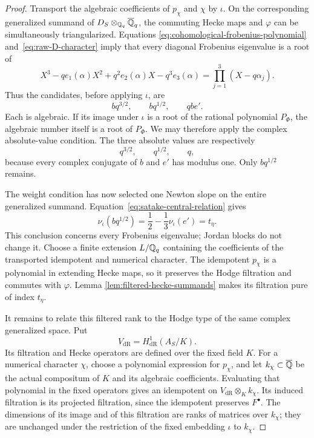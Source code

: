 \begin{proof}
Transport the algebraic coefficients of \(p_\chi\) and \(\chi\) by
\(\iota\). On the corresponding generalized summand of
\(D_S\otimes_{\mathbb{Q}_q}\overline{\mathbb{Q}}_q\), the commuting Hecke maps and
\(\varphi\) can be simultaneously triangularized. Equations
\eqref{eq:cohomological-frobenius-polynomial}
and~\eqref{eq:raw-D-character} imply that every diagonal Frobenius
eigenvalue is a root of
\[
X^3-qe_1(\alpha)X^2+q^2e_2(\alpha)X-q^3e_3(\alpha)
=\prod_{j=1}^3(X-q\alpha_j).
\]
Thus the candidates, before applying \(\iota\), are
\begin{equation}\label{eq:frobenius-candidates}
bq^{3/2},\qquad bq^{1/2},\qquad qbe'.
\end{equation}
Each is algebraic. If its image under \(\iota\) is a root of the
rational polynomial \(P_\Phi\), the algebraic number itself is a
root of \(P_\Phi\). We may therefore apply the complex
absolute-value condition. The three absolute values are respectively
\[
q^{3/2},\qquad q^{1/2},\qquad q,
\]
because every complex conjugate of \(b\) and \(e'\) has modulus one.
Only \(bq^{1/2}\) remains.

The weight condition has now selected one Newton slope on the entire
generalized summand. Equation~\eqref{eq:satake-central-relation} gives
\begin{equation}\label{eq:active-hodge-slope}
\nu_\iota(bq^{1/2})
=\frac12-\frac13\nu_\iota(e')=t_\eta.
\end{equation}
This conclusion concerns every Frobenius eigenvalue; Jordan blocks do
not change it. Choose a finite extension \(L/\mathbb{Q}_q\) containing the
coefficients of the transported idempotent and numerical character.
The idempotent \(p_\chi\)
is a polynomial in extending Hecke maps, so it preserves the Hodge
filtration and commutes with \(\varphi\). Lemma
\ref{lem:filtered-hecke-summands} makes its filtration pure of index
\(t_\eta\).

It remains to relate this filtered rank to the Hodge type of the same
complex generalized space. Put
\[
V_{\mathrm{dR}}=H^1_{\mathrm{dR}}(A_S/K).
\]
Its filtration and Hecke operators are defined over the fixed field
\(K\). For a numerical character \(\chi\), choose a polynomial
expression for \(p_\chi\), and let \(k_\chi\subset\overline{\mathbb{Q}}\) be the
actual compositum of \(K\) and its algebraic coefficients. Evaluating
that polynomial in the fixed operators gives an idempotent on
\(V_{\mathrm{dR}}\otimes_K k_\chi\). Its induced filtration is its
projected filtration, since the idempotent preserves \(F^\bullet\).
The dimensions of its image and of this filtration are ranks of
matrices over \(k_\chi\);
they are unchanged under the restriction of the fixed embedding
\(\iota\) to \(k_\chi\).


\end{proof}
